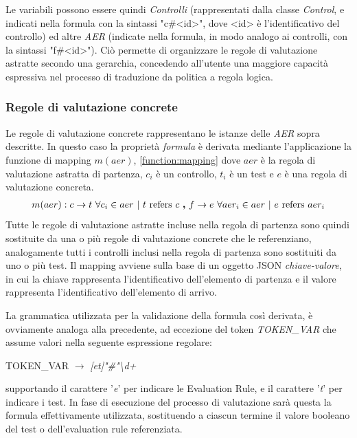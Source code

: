 \documentclass[../main.tex]{subfiles}
\begin{document}
Le variabili possono essere quindi \textit{Controlli} (rappresentati dalla classe \textit{Control}, e indicati nella formula con la sintassi "c\#<id>", dove <id> è l'identificativo del controllo) ed altre \textit{AER} (indicate nella formula, in modo analogo ai controlli, con la sintassi "f\#<id>"). Ciò permette di organizzare le regole di valutazione astratte secondo una gerarchia, concedendo all'utente una maggiore capacità espressiva nel processo di traduzione da politica a regola logica.


\subsubsection{Regole di valutazione concrete}

Le regole di valutazione concrete rappresentano le istanze delle \textit{AER} sopra descritte.
In questo caso la proprietà \textit{formula} è derivata mediante l'applicazione la funzione di mapping $m(aer)$, \eqref{function:mapping} dove $aer$ è la regola di valutazione astratta di partenza, $c_i$ è un controllo, $t_i$ è un test e $e$ è una regola di valutazione concreta.
\begin{equation}
\begin{gathered}
m(aer):
c \rightarrow t ~ \forall c_i \in aer ~ | ~ t ~ \text{refers} ~ c ~ \text{\textbf{,}} ~
        f \rightarrow e ~ \forall aer_i \in aer ~ | ~ e ~ \text{refers} ~ aer_i
\end{gathered}
\label{function:mapping}
\end{equation}
Tutte le regole di valutazione astratte incluse nella regola di partenza sono quindi sostituite da una o più regole di valutazione concrete che le referenziano, analogamente tutti i controlli inclusi nella regola di partenza sono sostituiti da uno o più test.
Il mapping avviene sulla base di un oggetto JSON \textit{chiave-valore}, in cui la chiave rappresenta l'identificativo dell'elemento di partenza e il valore rappresenta l'identificativo dell'elemento di arrivo.

La grammatica utilizzata per la validazione della formula così derivata, è ovviamente analoga alla precedente, ad eccezione del token \textit{TOKEN\_VAR} che assume valori nella seguente espressione regolare:
\begin{center}
    TOKEN\_VAR $\rightarrow$ \textit{[et]"\#"\textbackslash d+}
\end{center}
supportando il carattere '\textit{e}' per indicare le Evaluation Rule, e il carattere '\textit{t}' per indicare i test.
In fase di esecuzione del processo di valutazione sarà questa la formula effettivamente utilizzata, sostituendo a ciascun termine il valore booleano del test o dell'evaluation rule referenziata.
\vfill
\newpage
\end{document}
